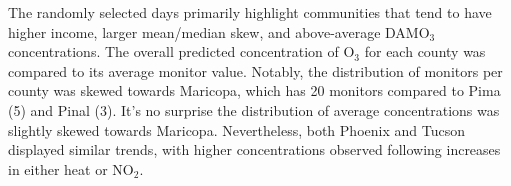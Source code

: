The randomly selected days primarily highlight communities that tend to have higher income, larger mean/median skew, and above-average DAMO$_3$ concentrations. The overall predicted concentration of O$_3$ for each county was compared to its average monitor value. Notably, the distribution of monitors per county was skewed towards Maricopa, which has 20 monitors compared to Pima (5) and Pinal (3). It’s no surprise the distribution of average concentrations was slightly skewed towards Maricopa. Nevertheless, both Phoenix and Tucson displayed similar trends, with higher concentrations observed following increases in either heat or NO$_2$. 


